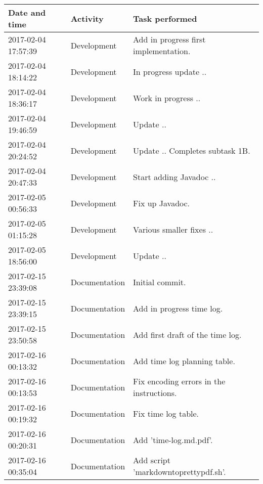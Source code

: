 \begin{table}[]
  \centering
  \begin{tabular}{@{}l|l|l}
    \toprule
    Date and time       & Activity      & Task performed                                     \\ \midrule
    2017-02-04 17:57:39 & Development   & Add in progress first implementation.              \\
    2017-02-04 18:14:22 & Development   & In progress update ..                              \\
    2017-02-04 18:36:17 & Development   & Work in progress ..                                \\
    2017-02-04 19:46:59 & Development   & Update ..                                          \\
    2017-02-04 20:24:52 & Development   & Update .. Completes subtask 1B.                    \\
    2017-02-04 20:47:33 & Development   & Start adding Javadoc ..                            \\
    2017-02-05 00:56:33 & Development   & Fix up Javadoc.                                    \\
    2017-02-05 01:15:28 & Development   & Various smaller fixes ..                           \\
    2017-02-05 18:56:00 & Development   & Update ..                                          \\
    2017-02-15 23:39:08 & Documentation & Initial commit.                                    \\
    2017-02-15 23:39:15 & Documentation & Add in progress time log.                          \\
    2017-02-15 23:50:58 & Documentation & Add first draft of the time log.                   \\
    2017-02-16 00:13:32 & Documentation & Add time log planning table.                       \\
    2017-02-16 00:13:53 & Documentation & Fix encoding errors in the instructions.           \\
    2017-02-16 00:19:32 & Documentation & Fix time log table.                                \\
    2017-02-16 00:20:31 & Documentation & Add 'time-log.md.pdf'.                             \\
    2017-02-16 00:35:04 & Documentation & Add script 'markdowntoprettypdf.sh'.               \\

\end{tabular}
\end{table}
